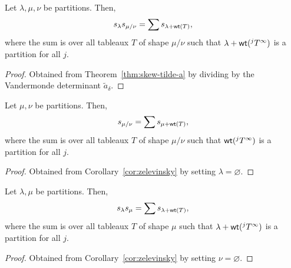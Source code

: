 \begin{corollary}[Zelevinsky] \label{cor:zelevinsky}
    Let \(\lambda, \mu, \nu\) be partitions.
    Then,
    \begin{equation}
        s_\lambda s_{\mu / \nu} =
        \sum s_{\lambda + \operatorname{\mathsf{wt}}(T)},
    \end{equation}
    where the sum is over all tableaux \(T\) of shape \(\mu/\nu\) such that \(\lambda + \operatorname{\mathsf{wt}}(^jT^\infty)\) is a partition for all \(j\).
\end{corollary}

\begin{proof}
    Obtained from Theorem~\ref{thm:skew-tilde-a} by dividing by the Vandermonde determinant \(\tilde{a}_\delta\).
\end{proof}

\begin{corollary}
    Let \(\mu, \nu\) be partitions.
    Then,
    \begin{equation}
        s_{\mu / \nu} = \sum s_{\mu + \operatorname{\mathsf{wt}}(T)},
    \end{equation}
    where the sum is over all tableaux \(T\) of shape \(\mu/\nu\) such that \(\operatorname{\mathsf{wt}}(^jT^\infty)\) is a partition for all \(j\).
\end{corollary}

\begin{proof}
    Obtained from Corollary~\ref{cor:zelevinsky} by setting \(\lambda = \varnothing\).
\end{proof}

\begin{corollary}
    Let \(\lambda, \mu\) be partitions.
    Then,
    \begin{equation}
        s_\lambda s_\mu = \sum s_{\lambda + \operatorname{\mathsf{wt}}(T)},
    \end{equation}
    where the sum is over all tableaux \(T\) of shape \(\mu\) such that \(\lambda + \operatorname{\mathsf{wt}}(^jT^\infty)\) is a partition for all \(j\).
\end{corollary}

\begin{proof}
    Obtained from Corollary~\ref{cor:zelevinsky} by setting \(\nu = \varnothing\).
\end{proof}

